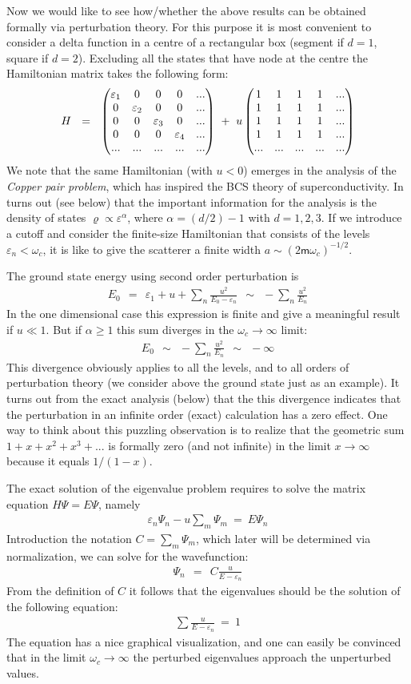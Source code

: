 \documentclass[onecolumn,fleqn, 11pt]{revtex4}
\newcommand{\mass}{\mathsf{m}}
\newcommand{\amatrix}[1]{\begin{matrix} #1 \end{matrix}}
\newcommand{\beq}{\begin{eqnarray}}
\newcommand{\eeq}{\end{eqnarray}}
\begin{document}
Now we would like to see how/whether the above results 
can be obtained formally via perturbation theory. 
For this purpose it is most convenient 
to consider a delta function in a centre 
of a rectangular box (segment if $d=1$, square if $d=2$). 
Excluding all the states that have node at the centre 
the Hamiltonian matrix takes the following form:
\beq 
H \ \ = \ \ \left(\amatrix{
\varepsilon_1 & 0 & 0 & 0 & ... \cr
0 & \varepsilon_2 & 0 & 0 & ... \cr
0 & 0 & \varepsilon_3 & 0 & ... \cr
0 & 0 & 0 & \varepsilon_4 & ... \cr
... & ... & ... & ... & ... 
}\right)
\ + \ u\left(\amatrix{
1 & 1 & 1 & 1 & ... \cr
1 & 1 & 1 & 1 & ... \cr
1 & 1 & 1 & 1 & ... \cr
1 & 1 & 1 & 1 & ... \cr
... & ... & ... & ... & ... 
}\right)
\eeq
We note that the same Hamiltonian (with ${u<0}$) 
emerges in the analysis of the {\em Copper pair problem},  
which has inspired the BCS theory of superconductivity.  
In turns out (see below) that the important 
information for the analysis is the density 
of states ${\varrho \propto \varepsilon^{\alpha}}$, 
where $\alpha=(d/2){-}1$ with $d=1,2,3$. 
If we introduce a cutoff and consider the 
finite-size Hamiltonian that consists 
of the levels ${\varepsilon_n<\omega_c}$, it is like 
to give the scatterer a finite width ${a \sim (2\mass\omega_c)^{-1/2}}$.


The ground state energy  
using second order perturbation is 
\beq 
E_0 \ \ = \ \ \varepsilon_1 + u + \sum_n \frac{u^2}{E_0-\varepsilon_n} 
\ \ \sim \ \   - \sum_n \frac{u^2}{E_n}  
\eeq
In the one dimensional case this expression is finite 
and give a meaningful result if $u\ll1$. 
But if $\alpha\ge 1$ this sum diverges in the $\omega_c\rightarrow\infty$ limit:
\beq 
E_0  \ \ \sim \ \   -\sum_n \frac{u^2}{E_n}  \ \ \sim \ \  -\infty 
\eeq
This divergence obviously applies to all the levels, 
and to all orders of perturbation theory 
(we consider above the ground state just as an example).  
It turns out from the exact analysis  (below) 
that the this divergence indicates that the perturbation 
in an infinite order (exact) calculation has a zero effect. 
One way to think about this puzzling observation is to 
realize that the geometric sum ${1+x+x^2+x^3+...}$ 
is formally zero (and not infinite) in the limit $x\rightarrow\infty$ 
because it equals ${1/(1-x)}$.    


The exact solution of the eigenvalue problem requires 
to solve the matrix equation ${H\Psi=E\Psi}$, namely 
\beq 
\varepsilon_n \Psi_n -u\sum_m\Psi_m  \ = \ E\Psi_n
\eeq
Introduction the notation $C=\sum_m\Psi_m$, 
which later will be determined via normalization, 
we can solve for the wavefunction:  
\beq 
\Psi_n  \ \ = \ \ C\frac{u}{E-\varepsilon_n}
\eeq
From the definition of $C$ it follows 
that the eigenvalues should be the solution 
of the following equation: 
\beq 
\sum \frac{u}{E-\varepsilon_n} \ = \ 1
\eeq
The equation has a nice graphical visualization, 
and one can easily be convinced that in the 
limit $\omega_c\rightarrow\infty$ the perturbed eigenvalues   
approach the unperturbed values. 
\end{document}
